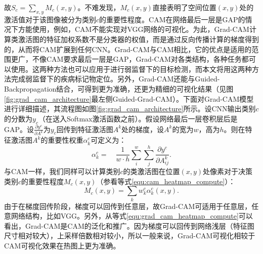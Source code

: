 故$S_{c}=\sum_{x,y} M_{c}(x, y)$。不难发现，$M_{c}(x, y)$直接表明了空间位置$(x,y)$处的激活值对于该图像被分为类别$c$的重要性程度。CAM在网络最后一层是GAP的情况下方能使用，例如，CAM不能实现对VGG网络的可视化。为此，Grad-CAM计算类激活图的特征加权系数不是分类器的权值，而是通过反向传播计算的梯度得到的，从而将CAM扩展到任何CNN。Grad-CAM与CAM相比，它的优点是适用的范围更广，不像CAM要求最后一层是GAP，Grad-CAM对各类结构，各种任务都可以使用。这两种方法也可以应用于进行弱监督下的目标检测，而本文将用这两种方法完成弱监督下的疾病标记物定位。另外，Grad-CAM还能与Guided-Backpropagation结合，可得到更为准确，还更为精细的可视化结果（见图\ref{fig:grad_cam_architecture}最左侧Guided-Grad-CAM）。下面对Grad-CAM模型进行详细描述，其流程图如图\ref{fig:grad_cam_architecture}所示。设CNN输出类别$c$的分数为$y_c$（在送入Softmax激活函数之前）。假设网络最后一层卷积层后是GAP。设$\frac{\partial y^{c}}{\partial A^{k}}$为$y_c$回传到特征激活图$A^{k}$处的梯度，设$A^{k}$的宽为$w$，高为$h$。则在特征激活图$A^{k}$的重要性权重$\alpha_{k}^{c}$可定义为：
\begin{equation}
\alpha_{k}^{c}=\quad \frac{1}{w·h} \sum_{i}^{w} \sum_{j}^{h} \frac{\partial y^{c}}{\partial A_{i j}^{k}}.
\end{equation}
与CAM一样，我们同样可以计算类别$c$的类激活图在位置$(x,y)$处像素对于决策类别$c$的重要性程度$M_c(x, y)$（参看等式\ref{equ:cam_heatmap_compute}）：
\begin{equation}\label{equ:grad_cam_heatmap_compute}
M_{c}(x, y)=\sum_{k} w_{k}^{c} \alpha_{k}^c(x, y).
\end{equation}
由于在梯度回传阶段，梯度可以回传到任意层，故Grad-CAM可适用于任意层，任意网络结构，比如VGG。另外，从等式\ref{equ:grad_cam_heatmap_compute}可以看出，Grad-CAM是CAM的泛化和推广。因为梯度可以回传到网络浅层（特征图尺寸相对较大），上采样倍数相对较小，所以一般来说，Grad-CAM可视化相较于CAM可视化效果在热图上更为准确。
